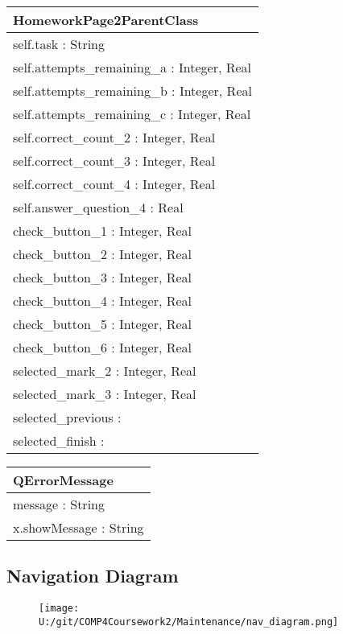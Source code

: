\begin{center}
\begin{tabular}{|p{7cm}|} \hline
\textbf{HomeworkPage2ParentClass} \\ \hline
self.task : String \\
self.attempts\_remaining\_a : Integer, Real \\
self.attempts\_remaining\_b : Integer, Real \\
self.attempts\_remaining\_c : Integer, Real \\
self.correct\_count\_2 : Integer, Real \\
self.correct\_count\_3 : Integer, Real \\
self.correct\_count\_4 : Integer, Real \\
self.answer\_question\_4 : Real \\ \hline
check\_button\_1 : Integer, Real \\
check\_button\_2 : Integer, Real \\
check\_button\_3 : Integer, Real \\
check\_button\_4 : Integer, Real \\
check\_button\_5 : Integer, Real \\
check\_button\_6 : Integer, Real \\
selected\_mark\_2 : Integer, Real \\
selected\_mark\_3 : Integer, Real \\
selected\_previous : \\
selected\_finish : \\ \hline
\end{tabular}
\end{center}

\begin{center}
\begin{tabular}{|p{7cm}|} \hline
\textbf{QErrorMessage} \\ \hline
message : String \\ \hline
x.showMessage : String \\ \hline
\end{tabular}
\end{center}

\subsection{Navigation Diagram}

\begin{figure}[H]
    \texttt{[image: U:/git/COMP4Coursework2/Maintenance/nav\_diagram.png]}
    \label{fig:print_function_result}
\end{figure}

